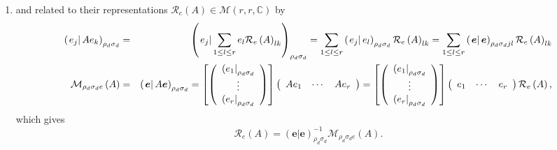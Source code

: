 \documentclass[aps,preprint]{revtex4}
\begin{document}
\begin{enumerate}
\begin{enumerate}
\item and related to their representations $\mathcal{R}_{e}\left( A\right)
\in \mathcal{M}\left( r,r,\mathbb{C}\right) $ by 
\begin{eqnarray}
\left( \left. \overset{}{e_{j}}\right\vert Ae_{k}\right) _{\rho _{d}\sigma
_{d}} &=&\left( \left. \overset{}{e_{j}}\right\vert \sum_{1\leq l\leq r}e_{l}%
\mathcal{R}_{e}\left( A\right) _{lk}\right) _{\rho _{d}\sigma
_{d}}=\sum_{1\leq l\leq r}\left( \left. e_{j}\right\vert e_{l}\right) _{\rho
_{d}\sigma _{d}}\mathcal{R}_{e}\left( A\right) _{lk}=\sum_{1\leq l\leq
r}\left( \left. \boldsymbol{e}\right\vert \boldsymbol{e}\right) _{\rho
_{d}\sigma _{d}jl}\mathcal{R}_{e}\left( A\right) _{lk} \\
\mathcal{M}_{\rho _{d}\sigma _{d}e}\left( A\right) &=&\left( \left. \overset{%
}{\boldsymbol{e}}\right\vert A\boldsymbol{e}\right) _{\rho _{d}\sigma _{d}}=%
\left[ \left( 
\begin{array}{c}
\left( e_{1}\right\vert _{\rho _{d}\sigma _{d}} \\ 
\vdots \\ 
\left( e_{r}\right\vert _{\rho _{d}\sigma _{d}}%
\end{array}%
\right) \right] \left( 
\begin{array}{ccc}
Ae_{1} & \cdots & Ae_{r}%
\end{array}%
\right) =\left[ \left( 
\begin{array}{c}
\left( e_{1}\right\vert _{\rho _{d}\sigma _{d}} \\ 
\vdots \\ 
\left( e_{r}\right\vert _{\rho _{d}\sigma _{d}}%
\end{array}%
\right) \right] \left( 
\begin{array}{ccc}
e_{1} & \cdots & e_{r}%
\end{array}%
\right) \mathcal{R}_{e}\left( A\right) ,
\end{eqnarray}%
which gives 
\begin{equation}
\mathcal{R}_{e}\left( A\right) =\left( \left. \boldsymbol{e}\right\vert 
\boldsymbol{e}\right) _{\rho _{d}\sigma _{d}}^{-1}\mathcal{M}_{\rho
_{d}\sigma _{d}e}\left( A\right) .
\end{equation}


\end{enumerate}
\end{enumerate}
\end{document}
